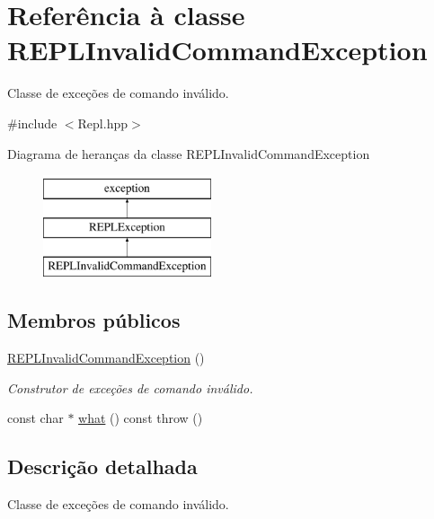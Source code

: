 \hypertarget{classREPLInvalidCommandException}{}\section{Referência à classe R\+E\+P\+L\+Invalid\+Command\+Exception}
\label{classREPLInvalidCommandException}


Classe de exceções de comando inválido.  




{\ttfamily \#include $<$Repl.\+hpp$>$}

Diagrama de heranças da classe R\+E\+P\+L\+Invalid\+Command\+Exception\begin{figure}[H]
\begin{center}
\leavevmode
\includegraphics[height=3.000000cm]{classREPLInvalidCommandException}
\end{center}
\end{figure}
\subsection*{Membros públicos}
\begin{DoxyCompactItemize}
\item 
\mbox{\label{classREPLInvalidCommandException_add845747cce364d6144985faae0ec16a}} 
\hyperlink{classREPLInvalidCommandException_add845747cce364d6144985faae0ec16a}{R\+E\+P\+L\+Invalid\+Command\+Exception} ()
\begin{DoxyCompactList}\small\item\em Construtor de exceções de comando inválido. \end{DoxyCompactList}\item 
const char $\ast$ \hyperlink{classREPLInvalidCommandException_aec4c314ef19ce522dedb49c7451bafc0}{what} () const  throw ()
\end{DoxyCompactItemize}


\subsection{Descrição detalhada}
Classe de exceções de comando inválido. 


